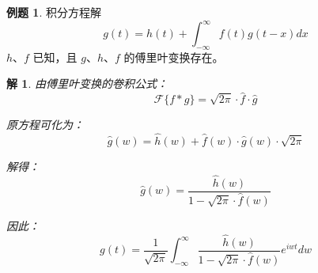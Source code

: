 \documentclass[12pt,a4paper]{article}
\numberwithin{subsection}{section}   %
\numberwithin{subsubsection}{subsection}
\theoremstyle{plain}
\newtheorem{solution}{解}[section]  %
\theoremstyle{definition}
\newtheorem{example}{例题}[section]  %
\theoremstyle{remark}
\theoremstyle{remark}
\begin{document}
\begin{example}
	积分方程解
	\begin{equation}
	  g(t) = h(t) + \int_{-\infty}^{\infty} f(t) g(t - x) dx
\end{equation}
	\( h \)、\( f \) 已知，且 \( g \)、\( h \)、\( f \) 的傅里叶变换存在。
	
	\begin{solution}
		由傅里叶变换的卷积公式：
		\begin{equation}
			\mathcal{F}\{f * g\} = \sqrt{2\pi} \cdot \hat{f} \cdot \hat{g}
		\end{equation}
		
		原方程可化为：
		\begin{equation}
			\hat{g}(w) = \hat{h}(w) + \hat{f}(w) \cdot \hat{g}(w) \cdot \sqrt{2\pi}
		\end{equation}
		
		解得：
		\begin{equation}
			\hat{g}(w) = \frac{\hat{h}(w)}{1 - \sqrt{2\pi} \cdot \hat{f}(w)}
		\end{equation}
		
		因此：
		\begin{equation}
			g(t) = \frac{1}{\sqrt{2\pi}} \int_{-\infty}^{\infty} \frac{\hat{h}(w)}{1 - \sqrt{2\pi} \cdot \hat{f}(w)} e^{iwt} dw
		\end{equation}
		
	\end{solution}
\end{example}
\end{document}
